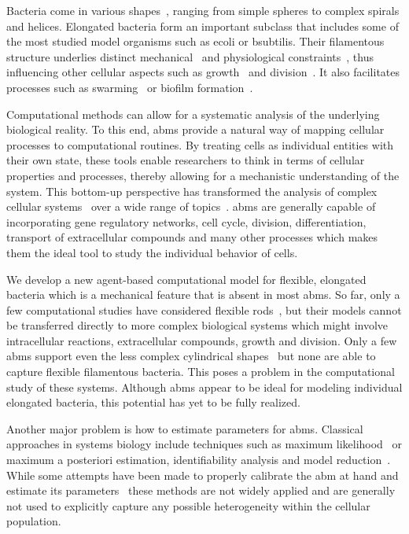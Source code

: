 \documentclass[10pt,letterpaper]{article}
\begin{document}
Bacteria come in various shapes~\cite{Young2006,Young2007}, ranging from simple spheres to complex
spirals and helices.
Elongated bacteria form an important subclass that includes some of the most studied model
organisms such as \ac{ecoli} or \ac{bsubtilis}.
Their filamentous structure underlies distinct mechanical~\cite{Daniel2003} and physiological
constraints~\cite{Jones2001}, thus influencing other cellular aspects such as
growth~\cite{Chang2014} and division~\cite{Li2007}.
It also facilitates processes such as swarming~\cite{Harshey1994} or biofilm
formation~\cite{Duvernoy2018}.

Computational methods can allow for a systematic analysis of the underlying biological reality.
To this end, \acp{abm} provide a natural way of mapping cellular processes to computational
routines.
By treating cells as individual entities with their own state, these tools enable researchers to
think in terms of cellular properties and processes, thereby allowing for a mechanistic
understanding of the system.
This bottom-up perspective has transformed the analysis of complex cellular
systems~\cite{Pleyer2023} over a wide range of
topics~\cite{Ghaffarizadeh2018,Cooper2020,Karolak2021,DeRybel2014}.
\acp{abm} are generally capable of incorporating gene regulatory networks, cell cycle, division,
differentiation, transport of extracellular compounds and many other processes which makes them the
ideal tool to study the individual behavior of cells.

We develop a new agent-based computational model for flexible, elongated bacteria which
is a mechanical feature that is absent in most \acp{abm}.
So far, only a few computational studies have considered flexible rods~\cite{Duman2018,Joshi2019},
but their models cannot be transferred directly to more complex biological systems which might
involve intracellular reactions, extracellular compounds, growth and division.
Only a few \acp{abm} support even the less complex cylindrical
shapes~\cite{Kang2014,Breitwieser2021,Gorochowski2012} but none are able to capture
flexible filamentous bacteria.
This poses a problem in the computational study of these systems.
Although \acp{abm} appear to be ideal for modeling individual elongated bacteria, this potential
has yet to be fully realized.

Another major problem is how to estimate parameters for \acp{abm}.
Classical approaches in systems biology include techniques such as maximum
likelihood~\cite{Kreutz2013,Raue2014} or maximum a posteriori estimation, identifiability analysis
and model reduction~\cite{Simpson2025,Gbor2015,Banga2008,Ashyraliyev2009}.
While some attempts have been made to properly calibrate the \ac{abm} at hand and estimate its
parameters~\cite{An2016,Lima2021,Dancik2010,Thiele2014} these methods are not widely applied and are
generally not used to explicitly capture any possible heterogeneity within the cellular population.
\end{document}
